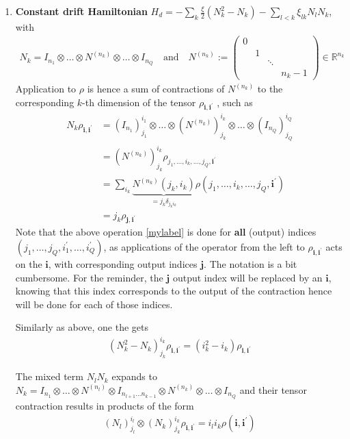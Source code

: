 \documentclass[letterpaper]{article}
\newcommand{\R}{\mathds{R}}
\newcommand{\bfi}{\boldsymbol{i}}
\newcommand{\bfj}{\boldsymbol{j}}
\newcommand{\p}{\prime}
\begin{document}
\begin{enumerate}
    \item \textbf{Constant drift Hamiltonian} $H_d = -\sum_k \frac{\xi}{2} \left(N_k^2 - N_k\right) - \sum_{l<k} \xi_{lk} N_lN_k$, with
      \begin{align}
      N_k = I_{n_1}\otimes \dots \otimes N^{(n_k)} \otimes \dots \otimes I_{n_Q} \quad \text{and} \quad N^{(n_k)} := \begin{pmatrix} 0 & & \\ & 1& \\ & & \ddots \\ & & & n_k -1\end{pmatrix} \in \R^{n_k}
      \end{align}
      Application to $\rho$ is hence a sum of contractions of $N^{(n_k)}$ to the corresponding $k$-th dimension of the tensor $\rho_{\bfi, \bfi^\p}$ , such as
      \begin{align}
        N_k \rho_{\bfi, \bfi^\p} &=  \left(I_{n_1}\right)^{i_1}_{j_1}\otimes \dots \otimes \left(N^{(n_k)}\right)^{i_k}_{j_k} \otimes \dots \otimes \left(I_{n_Q}\right)^{i_Q}_{j_Q} \label{mylabel} \\ 
        &= \left(N^{(n_k)}\right)_{j_k}^{i_k} \rho_{j_1,\dots, i_k, \dots, j_Q, \bfi^\p} \\
        &= \sum_{i_k} \underbrace{N^{(n_k)}(j_k, i_k)}_{ = j_k\delta_{j_ki_k} } \rho(j_1,\dots, i_k,\dots, j_Q, \bfi^\p) \\
        &= j_k \rho_{\bfj, \bfi^\p}
      \end{align}
      Note that the above operation \eqref{mylabel} is done for \textbf{all} (output) indices $(j_1, \dots, j_Q, i_1^\p,\dots,i_Q^\p)$, as applications of the operator from the left to $\rho_{\bfi, \bfi^\p}$ acts on the $\bfi$, with corresponding output indices $\bfj$. The notation is a bit cumbersome. For the reminder, the $\bfj$ output index will be replaced by an $\bfi$, knowing that this index corresponds to the output of the contraction hence will be done for each of those indices. 

      Similarly as above, one the gets
      \begin{align}
        \left(N_k^2-N_k\right)_{j_k}^{i_k} \rho_{\bfi, \bfi^\p} = \left(i_k^2 - i_k\right) \rho_{\bfi,\bfi^\prime}
      \end{align}

      The mixed term $N_lN_k$ expands to $N_k = I_{n_1}\otimes \dots \otimes N^{(n_l)} \otimes I_{n_{l+1} \dots n_{k-1}}\otimes N^{(n_k)} \otimes \dots \otimes I_{n_Q}$ and their tensor contraction results in products of the form 
      \begin{align}
        (N_l)^{i_l}_{j_l} \otimes (N_k)_{j_k}^{i_k} \rho_{\bfi, \bfi^\p} = i_li_k\rho(\bfi, \bfi^\prime)
      \end{align}


\end{enumerate}
\end{document}
